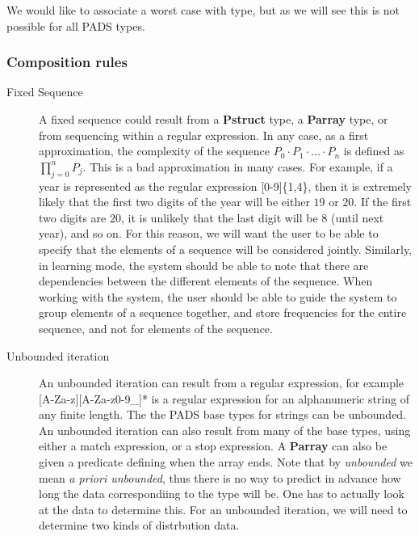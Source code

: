 We would like to associate a worst case with type, but as we will see
this is not possible for all PADS types.

\subsubsection{Composition rules}

\begin{description}

\item [Fixed Sequence]
A fixed sequence could result from a \textbf{Pstruct} type, a
\textbf{Parray} type, or from sequencing within a regular expression.
In any case, as a first approximation, the complexity of the sequence
$P_0 \cdot P_1 \cdot \ldots \cdot P_n$ is defined as $\prod^n_{j=0} P_j$.
This is a bad approximation in many cases. For example, if a
year is represented as the regular expression \textsf{[0-9]\{1,4\}},
then it is extremely likely that the first two digits of the year will
be either $19$ or $20$.  If the first two digits are $20$, it is
unlikely that the last digit will be $8$ (until next year), and so
on. For this reason, we will want the user to be able to specify that
the elements of a sequence will be considered jointly. Similarly, in
learning mode, the system should be able to note that there are
dependencies between the different elements of the sequence. When
working with the system, the user should be able to guide the system
to group elements of a sequence together, and store frequencies for
the entire sequence, and not for elements of the sequence.

\item [Unbounded iteration]
An unbounded iteration can result from a regular expression, for
example \textsf{[A-Za-z][A-Za-z0-9\_\-]*} is a regular expression for
an alphanumeric string of any finite length. The the PADS base types
for strings can be unbounded. An unbounded iteration can also result
from many of the base types, using either a match expression, or a
stop expression. A \textbf{Parray} can also be given a predicate
defining when the array ends. Note that by \textit{unbounded} we mean
\textit{a priori unbounded}, thus there is no way to predict in
advance how long the data correspondiing to the type will be. One has
to actually look at the data to determine this. For an unbounded
iteration, we will need to determine two kinds of distrbution data.


\end{description}
